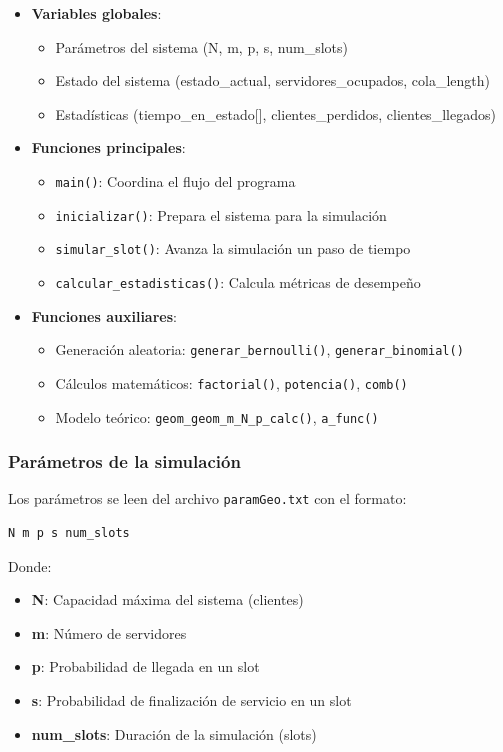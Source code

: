 \documentclass{article}
\begin{document}
\begin{itemize}
    \item \textbf{Variables globales}:
    \begin{itemize}
        \item Parámetros del sistema (N, m, p, s, num\_slots)
        \item Estado del sistema (estado\_actual, servidores\_ocupados, cola\_length)
        \item Estadísticas (tiempo\_en\_estado[], clientes\_perdidos, clientes\_llegados)
    \end{itemize}
    
    \item \textbf{Funciones principales}:
    \begin{itemize}
        \item \texttt{main()}: Coordina el flujo del programa
        \item \texttt{inicializar()}: Prepara el sistema para la simulación
        \item \texttt{simular\_slot()}: Avanza la simulación un paso de tiempo
        \item \texttt{calcular\_estadisticas()}: Calcula métricas de desempeño
    \end{itemize}
    
    \item \textbf{Funciones auxiliares}:
    \begin{itemize}
        \item Generación aleatoria: \texttt{generar\_bernoulli()}, \texttt{generar\_binomial()}
        \item Cálculos matemáticos: \texttt{factorial()}, \texttt{potencia()}, \texttt{comb()}
        \item Modelo teórico: \texttt{geom\_geom\_m\_N\_p\_calc()}, \texttt{a\_func()}
    \end{itemize}
\end{itemize}

\subsubsection{Parámetros de la simulación}

Los parámetros se leen del archivo \texttt{paramGeo.txt} con el formato:

\begin{verbatim}
N m p s num_slots
\end{verbatim}

Donde:
\begin{itemize}
    \item \textbf{N}: Capacidad máxima del sistema (clientes)
    \item \textbf{m}: Número de servidores
    \item \textbf{p}: Probabilidad de llegada en un slot
    \item \textbf{s}: Probabilidad de finalización de servicio en un slot
    \item \textbf{num\_slots}: Duración de la simulación (slots)
\end{itemize}
\end{document}
